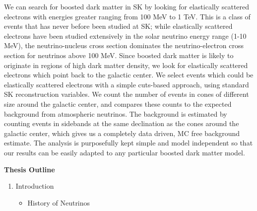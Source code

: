 \documentclass[12pt,oneside,openright]{article}
\begin{document}
We can search for boosted dark matter in SK by looking for elastically scattered electrons with energies greater ranging from 100 MeV to 1 TeV.  This is a class of events that has never before been studied at SK; while elastically scattered electrons have been studied extensively in the solar neutrino energy range (1-10 MeV), the neutrino-nucleus cross section dominates the neutrino-electron cross section for neutrinos above 100 MeV.  Since boosted dark matter is likely to originate in regions of high dark matter density, we look for elastically scattered electrons which point back to the galactic center.  We select events which could be elastically scattered electrons with a simple cuts-based approach, using standard SK reconstruction variables.  We count the number of events in cones of different size around the galactic center, and compares these counts to the expected background from atmospheric neutrinos.  The background is estimated by counting events in sidebands at the same declination as the cones around the galactic center, which gives us a completely data driven, MC free background estimate.  The analysis is purposefully kept simple and model independent so that our results can be easily adapted to any particular boosted dark matter model.\par
\newpage
\bf{Thesis Outline}
\begin{enumerate}
\item Introduction
	\begin{itemize} 
	\item History of Neutrinos 
	\end{itemize}   
\end{enumerate}
\end{document}
